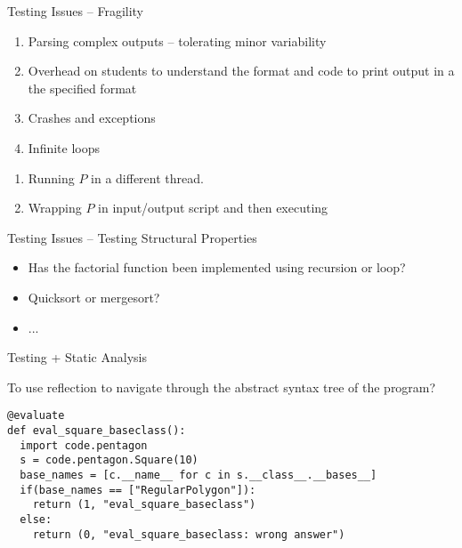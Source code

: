\documentclass{beamer}
\begin{document}
\begin{frame}[fragile]{Testing}
{Issues -- Fragility}

\begin{enumerate}
\item Parsing complex outputs -- tolerating minor variability
\item Overhead on students to understand the format and code to print output in a the specified format
\item Crashes and exceptions
\item Infinite loops
\end{enumerate}

\begin{enumerate}
\item Running $P$ in a different thread.
\item Wrapping $P$ in input/output script and then executing
\end{enumerate}
\end{frame}


\begin{frame}[fragile]{Testing}
{Issues -- Testing Structural Properties}

\begin{itemize}
\item Has the factorial function been implemented using recursion or loop?
\item Quicksort or mergesort?
\item ...
\end{itemize}

\end{frame}


\begin{frame}[fragile]{Testing + Static Analysis}

To use reflection to navigate through the abstract syntax tree of the program?


\begin{lstlisting}[frame=single]
@evaluate
def eval_square_baseclass():
  import code.pentagon
  s = code.pentagon.Square(10)
  base_names = [c.__name__ for c in s.__class__.__bases__]
  if(base_names == ["RegularPolygon"]):
    return (1, "eval_square_baseclass")
  else:
    return (0, "eval_square_baseclass: wrong answer")
\end{lstlisting}


\end{frame}
\end{document}
